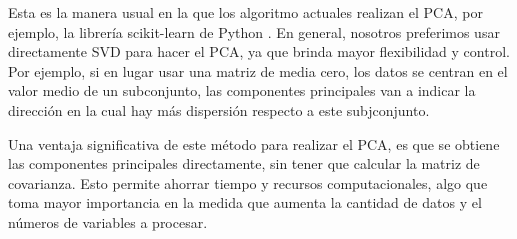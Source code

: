 Esta es la manera usual en la que los algoritmo actuales realizan el PCA, por ejemplo, la librería scikit-learn de Python \cite{scikit-learn}. En general, nosotros preferimos usar directamente SVD para hacer el PCA, ya que brinda mayor flexibilidad y control. Por ejemplo, si en lugar usar una matriz de media cero, los datos se centran en el valor medio de un subconjunto, las componentes principales van a indicar la dirección en la cual hay más dispersión respecto a este subjconjunto.

Una ventaja significativa de este método para realizar el PCA, es que se obtiene las componentes principales directamente, sin tener que calcular la matriz de covarianza. Esto permite ahorrar tiempo y recursos computacionales, algo que toma mayor importancia en la medida que aumenta la cantidad de datos y el números de variables a procesar.








